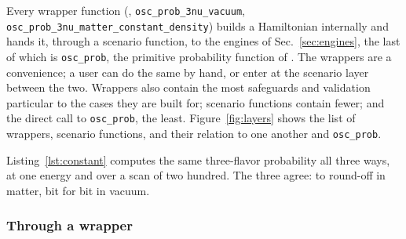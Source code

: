 Every wrapper function (\eg, {\tt osc\_prob\_3nu\_vacuum}, {\tt osc\_prob\_3nu\_matter\_constant\_density}) builds a Hamiltonian internally and hands it, through a scenario function, to the engines of Sec.~\ref{sec:engines}, the last of which is {\tt osc\_prob}, the primitive probability function of \magnus. The wrappers are a convenience; a user can do the same by hand, or enter at the scenario layer between the two. Wrappers also contain the most safeguards and validation particular to the cases they are built for; scenario functions contain fewer; and the direct call to {\tt osc\_prob}, the least.  Figure~\ref{fig:layers} shows the list of wrappers, scenario functions, and their relation to one another and {\tt osc\_prob}.

Listing~\ref{lst:constant} computes the same three-flavor probability all three ways, at one energy and over a scan of two hundred. The three agree: to round-off in matter, bit for bit in vacuum. 


\subsubsection{Through a wrapper}
\label{sec:wrappers}


